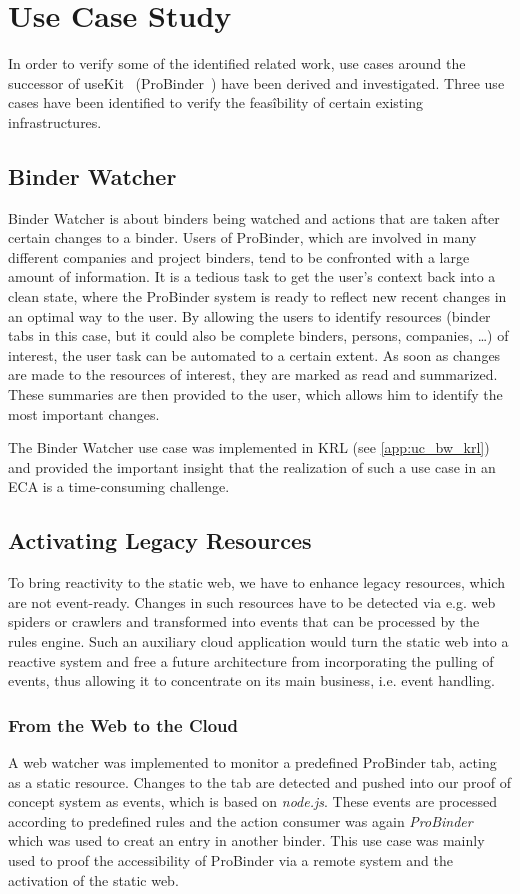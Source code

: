 \documentclass[11pt]{article}%
\begin{document}
\section{Use Case Study}
In order to verify some of the identified related work, use cases around the successor of useKit~\cite{2010-Rizzotti_Burkhart-useKit.pdf} (ProBinder~\cite{wwwprobinder}) have been derived and investigated. 
Three use cases have been identified to verify the feasîbility of certain existing infrastructures.

\subsection{Binder Watcher}
Binder Watcher is about binders being watched and actions that are taken after certain changes to a binder. Users of ProBinder, which are involved in many different companies and project binders, tend to be confronted with a large amount of information. It is a tedious task to get the user's context back into a clean state, where the ProBinder system is ready to reflect new recent changes in an optimal way to the user. By allowing the users to identify resources (binder tabs in this case, but it could also be complete binders, persons, companies, \dots) of interest, the user task can be automated to a certain extent. As soon as changes are made to the resources of interest, they are marked as read and summarized. These summaries are then provided to the user, which allows him to identify the most important changes.

The Binder Watcher use case was implemented in KRL (see \ref{app:uc_bw_krl}) and provided the important insight that the realization of such a use case in an ECA is a time-consuming challenge. 

\subsection{Activating Legacy Resources}
To bring reactivity to the static web, we have to enhance legacy resources, which are not event-ready. Changes in such resources have to be detected via e.g. web spiders or crawlers and transformed into events that can be processed by the rules engine. Such an auxiliary cloud application would turn the static web into a reactive system and free a future architecture from incorporating the pulling of events, thus allowing it to concentrate on its main business, i.e. event handling.

\subsubsection{From the Web to the Cloud}
A web watcher was implemented to monitor a predefined ProBinder tab, acting as a static resource. Changes to the tab are detected and pushed into our proof of concept system as events, which is based on \emph{node.js}. These events are processed according to predefined rules and the action consumer was again \emph{ProBinder} which was used to creat an entry in another binder. This use case was mainly used to proof the accessibility of ProBinder via a remote system and the activation of the static web.
\end{document}
